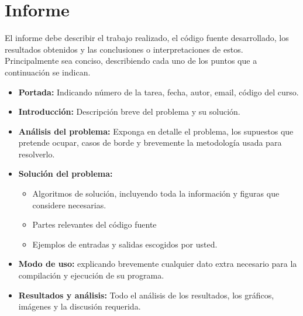 \documentclass[dcc]{fcfmcourse}
\begin{document}
\section{Informe}

El informe debe describir el trabajo realizado, el código fuente desarrollado, los resultados obtenidos y las conclusiones o interpretaciones de estos. Principalmente sea conciso, describiendo cada uno de los puntos que a continuación se indican.

\begin{itemize}
    \item \textbf{Portada:} Indicando número de la tarea, fecha, autor, email, código del curso.
    \item \textbf{Introducción:} Descripción breve del problema y su solución.
    \item \textbf{Análisis del problema:} Exponga en detalle el problema, los supuestos que pretende ocupar, casos de borde y brevemente la metodología usada para resolverlo.
    \item \textbf{Solución del problema:}
    \begin{itemize}
        \item Algoritmos de solución, incluyendo toda la información y figuras que considere necesarias.
        \item Partes relevantes del código fuente
        \item Ejemplos de entradas y salidas escogidos por usted.
    \end{itemize}
    \item \textbf{Modo de uso:} explicando brevemente cualquier dato extra necesario para la compilación y ejecución de su programa.
    \item \textbf{Resultados y análisis:} Todo el análisis de los resultados, los gráficos, imágenes y la discusión requerida.
\end{itemize}
\end{document}
